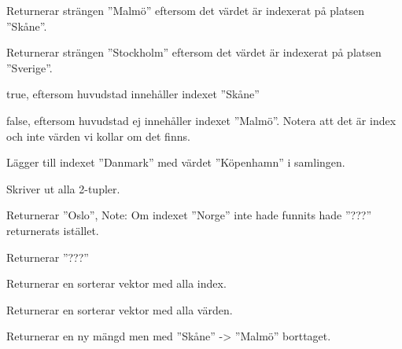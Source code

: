 {{\Subtask {}

\Subtask {}

\Subtask {}

\Subtask {}

\Subtask {}

\Subtask {}

\Subtask {}

\Subtask {}

\Subtask {}

\Subtask {}

\Subtask {}

\Subtask {}

\Subtask {}



\SOLUTION


\TaskSolved \what
 

\SubtaskSolved 
Returnerar strängen ''Malmö'' eftersom det värdet är indexerat på platsen ''Skåne''.

\SubtaskSolved 
Returnerar strängen ''Stockholm'' eftersom det värdet är indexerat på platsen ''Sverige''.

\SubtaskSolved 
true, eftersom huvudstad innehåller indexet ''Skåne''

\SubtaskSolved 
false, eftersom huvudstad ej innehåller indexet ''Malmö''. Notera att det är index och inte värden vi
kollar om det finns.

\SubtaskSolved 
Lägger till indexet ''Danmark'' med värdet ''Köpenhamn'' i samlingen.

\SubtaskSolved 
Skriver ut alla 2-tupler.

\SubtaskSolved 
Returnerar ''Oslo'', Note: Om indexet ''Norge'' inte hade funnits hade ''???'' returnerats istället.

\SubtaskSolved 
Returnerar ''???''

\SubtaskSolved 
Returnerar en sorterar vektor med alla index.

\SubtaskSolved 
Returnerar en sorterar vektor med alla värden.

\SubtaskSolved 
Returnerar en ny mängd men med ''Skåne'' -> ''Malmö'' borttaget.

}}
